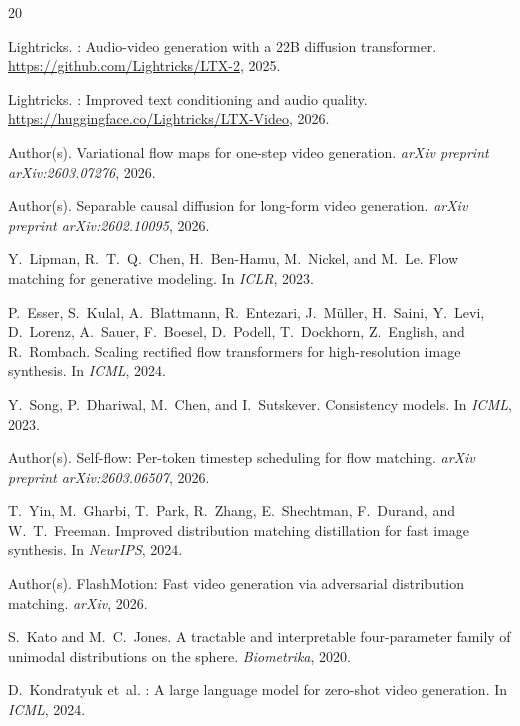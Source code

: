\documentclass[10pt,twocolumn]{article}
\begin{document}

\begin{thebibliography}{20}

Lightricks.
: Audio-video generation with a 22B diffusion transformer.
\newblock \url{https://github.com/Lightricks/LTX-2}, 2025.

Lightricks.
: Improved text conditioning and audio quality.
\newblock \url{https://huggingface.co/Lightricks/LTX-Video}, 2026.

Author(s).
\newblock Variational flow maps for one-step video generation.
\newblock \emph{arXiv preprint arXiv:2603.07276}, 2026.

Author(s).
\newblock Separable causal diffusion for long-form video generation.
\newblock \emph{arXiv preprint arXiv:2602.10095}, 2026.

Y.~Lipman, R.~T.~Q.~Chen, H.~Ben-Hamu, M.~Nickel, and M.~Le.
\newblock Flow matching for generative modeling.
\newblock In \emph{ICLR}, 2023.

P.~Esser, S.~Kulal, A.~Blattmann, R.~Entezari, J.~M{\"u}ller, H.~Saini,
  Y.~Levi, D.~Lorenz, A.~Sauer, F.~Boesel, D.~Podell, T.~Dockhorn, Z.~English,
  and R.~Rombach.
\newblock Scaling rectified flow transformers for high-resolution image
  synthesis.
\newblock In \emph{ICML}, 2024.

Y.~Song, P.~Dhariwal, M.~Chen, and I.~Sutskever.
\newblock Consistency models.
\newblock In \emph{ICML}, 2023.

Author(s).
\newblock Self-flow: Per-token timestep scheduling for flow matching.
\newblock \emph{arXiv preprint arXiv:2603.06507}, 2026.

T.~Yin, M.~Gharbi, T.~Park, R.~Zhang, E.~Shechtman, F.~Durand, and W.~T.~Freeman.
\newblock Improved distribution matching distillation for fast image synthesis.
\newblock In \emph{NeurIPS}, 2024.

Author(s).
\newblock FlashMotion: Fast video generation via adversarial distribution matching.
\newblock \emph{arXiv}, 2026.

S.~Kato and M.~C.~Jones.
\newblock A tractable and interpretable four-parameter family of unimodal
  distributions on the sphere.
\newblock \emph{Biometrika}, 2020.

D.~Kondratyuk et~al.
: A large language model for zero-shot video generation.
\newblock In \emph{ICML}, 2024.


\end{thebibliography}
\end{document}
